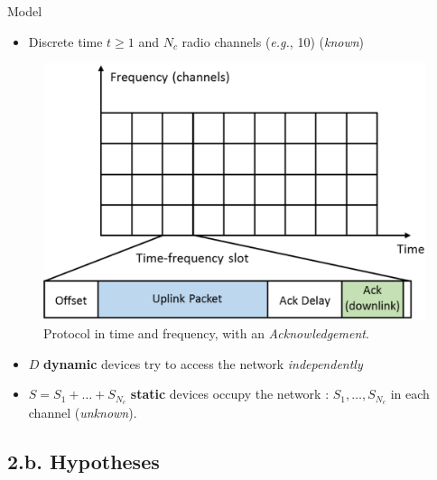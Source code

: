 \documentclass[12pt,english,ignorenonframetext,]{beamer}
\providecommand{\tightlist}{%
  \setlength{\itemsep}{0pt}\setlength{\parskip}{0pt}}
\begin{document}
\begin{frame}{Model}

\begin{itemize}
\tightlist
\item
  Discrete time \(t\geq1\) and \(N_c\) radio channels (\emph{e.g.}, 10)
  \hfill{} (\emph{known})
\end{itemize}

\begin{figure}[h!]
\centering
\includegraphics[height=0.35\textheight]{protocol.eps}
\caption{\small{Protocol in time and frequency, with an \emph{Acknowledgement}.}}
\end{figure}

\begin{itemize}
\tightlist
\item
  \(D\) \textbf{dynamic} devices try to access the network
  \emph{independently}
\item
  \(S=S_1+\dots+S_{N_c}\) \textbf{static} devices occupy the network :
  \newline
   \(S_1,\dots,S_{N_c}\) in each channel \hfill{} (\emph{unknown}).
\end{itemize}

\end{frame}



\subsection{\hfill{}2.b. Hypotheses\hfill{}}
\end{document}
